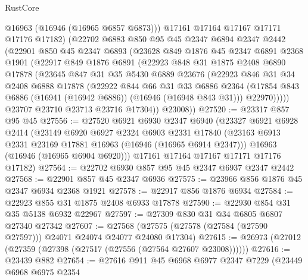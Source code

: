 \begin{lexlean}{RustCore}
\begin{coremodule}
          @16963
          (@16946 (@16965 @6857 @6873)))
        @17161
        @17164
        @17167
        @17171
        @17176
        @17182)
      (@22702
        @6883
        @850
        @95
        @45
        @2347
        @6894
        @2347
        @2442
        (@22901
          @850
          @45
          @2347
          @6893
          (@23628
            @849
            @1876
            @45
            @2347
            @6891
            @2368
            @1901
            (@22917
              @849
              @1876
              @6891
              (@22923
                @848
                @31
                @1875
                @2408
                @6890
                @17878
                (@23645
                  @847
                  @31
                  @35
                  @5430
                  @6889
                  @23676
                  (@22923
                    @846
                    @31
                    @34
                    @2408
                    @6888
                    @17878
                    (@22922
                      @844
                      @66
                      @31
                      @33
                      @6886
                      @2364
                      (@17854 @843 @6886 (@16941 (@16942 @6886)) (@16946 (@16948 @843 @31)))
                      @22970)))))
            @23707
            @23710
            @23713
            @23716
            @17304))
        @23008))
@27520 := @23317 @857 @95 @45
@27556 := @27520
    @6921
    @6930
    @2347
    @6940
    (@23327
      @6921
      @6928
      @2414
      (@23149
        @6920
        @6927
        @2324
        @6903
        @2331
        @17840
        (@23163 @6913 @2331 @23169 @17881 @16963 (@16946 (@16965 @6914 @2347)))
        @16963
        (@16946 (@16965 @6904 @6920)))
      @17161
      @17164
      @17167
      @17171
      @17176
      @17182)
@27564 := @22702 @6930 @857 @95 @45 @2347 @6937 @2347 @2442
@27568 := @22901 @857 @45 @2347 @6936
@27575 := @23966 @856 @1876 @45 @2347 @6934 @2368 @1921
@27578 := @22917 @856 @1876 @6934
@27584 := @22923 @855 @31 @1875 @2408 @6933 @17878
@27590 := @22930 @854 @31 @35 @5138 @6932 @22967
@27597 := @27309 @830 @31 @34 @6805 @6807 @27340 @27342
@27607 := @27568 (@27575 (@27578 (@27584 (@27590 @27597))) @24071 @24074 @24077 @24080 @17304)
@27615 := @26973 (@27012 (@27359 (@27398 (@27517 (@27556 (@27564 @27607 @23008))))))
@27616 := @23439 @882
@27654 := @27616
    @911
    @45
    @6968
    @6977
    @2347
    @7229
    (@23449
      @6968
      @6975
      @2354

\end{coremodule}
\end{lexlean}
